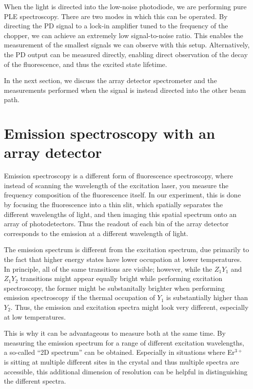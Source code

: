 \documentclass[12pt]{report}
\newcommand{\erbium}[1][ ]{Er$^{3+}$#1}
\begin{document}
When the light is directed into the low-noise photodiode, we are performing pure PLE spectroscopy. There are two modes in which this can be operated. By directing the PD signal to a lock-in amplifier tuned to the frequency of the chopper, we can achieve an extremely low signal-to-noise ratio. This enables the measurement of the smallest signals we can observe with this setup. Alternatively, the PD output can be measured directly, enabling direct observation of the decay of the fluorescence, and thus the excited state lifetime.

In the next section, we discuss the array detector spectrometer and the measurements performed when the signal is instead directed into the other beam path.

\section{Emission spectroscopy with an array detector}
\label{sec:emiss-spectr-with}

Emission spectroscopy is a different form of fluorescence spectroscopy, where instead of scanning the wavelength of the excitation laser, you measure the frequency composition of the fluorescence itself. In our experiment, this is done by focusing the fluorescence into a thin slit, which spatially separates the different wavelengths of light, and then imaging this spatial spectrum onto an array of photodetectors. Thus the readout of each bin of the array detector corresponds to the emission at a different wavelength of light.

The emission spectrum is different from the excitation spectrum, due primarily to the fact that higher energy states have lower occupation at lower temperatures. In principle, all of the same transitions are visible; however, while the $Z_{1}Y_{1}$ and $Z_{1}Y_{2}$ transitions might appear equally bright while performing excitation spectroscopy, the former might be substanitally brighter when performing emission spectroscopy if the thermal occupation of $Y_{1}$ is substantially higher than $Y_{2}$. Thus, the emission and excitation spectra might look very different, especially at low temperatures.

This is why it can be advantageous to measure both at the same time. By measuring the emission spectrum for a range of different excitation wavelengths, a so-called ``2D spectrum'' can be obtained. Especially in situations where \erbium is sitting at multiple different sites in the crystal and thus multiple spectra are accessible, this additional dimension of resolution can be helpful in distinguishing the different spectra.
\end{document}
